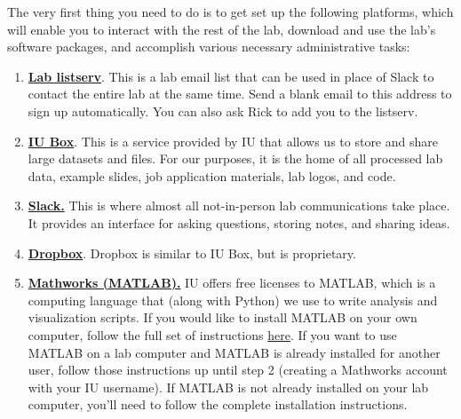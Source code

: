 \documentclass{tufte-book} %
\begin{document}
{}

\noindent
{}

The very first thing you need to do is to get set up the following platforms, which will enable you to interact with the rest of the lab, download and use the lab's software packages, and
accomplish various necessary administrative tasks:
\begin{enumerate}

\item \href{bnbl-l-subscribe@list.indiana.edu}{\textbf{Lab listserv}}. This is a lab email list that can be used in place of Slack to contact the entire lab at the same time. Send a blank email to this address to sign up automatically. You can also ask Rick to add you to the listserv.

\item \href{https://uits.iu.edu/box}{\textbf{IU Box}}. This is a service provided by IU that allows us to store and share large datasets and files. For our purposes, it is the home of all processed lab data, example slides, job application materials, lab logos, and code.

\item \href{https://bnbl.slack.com}{\textbf{Slack.}} This is where almost all not-in-person lab communications take place. It provides an interface for asking questions, storing notes, and sharing ideas.

\item \href{https://www.dropbox.com}{\textbf{Dropbox}}. Dropbox is similar to IU Box, but is proprietary.

\item \href{https://www.mathworks.com}{\textbf{Mathworks (MATLAB).}} IU offers free licenses to MATLAB, which is a computing language that (along with Python) we use to write analysis and visualization scripts. If you would like to install MATLAB on your own computer, follow the full set of instructions \href{https://kb.iu.edu/d/ajmh}{here}. If you want to use MATLAB on a lab computer and MATLAB is already installed for another user, follow those instructions up until step 2 (creating a Mathworks account with your IU username). If MATLAB is not already installed on your lab computer, you'll need to follow the complete installation instructions.


\end{enumerate}
\end{document}
